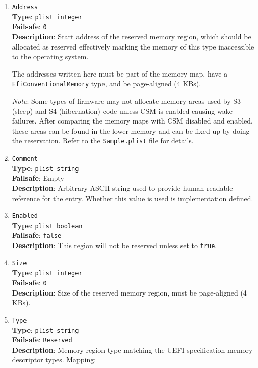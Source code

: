 \documentclass[]{article}
\begin{document}
\begin{enumerate}

\item
  \texttt{Address}\\
  \textbf{Type}: \texttt{plist\ integer}\\
  \textbf{Failsafe}: \texttt{0}\\
  \textbf{Description}: Start address of the reserved memory region, which should be allocated
  as reserved effectively marking the memory of this type inaccessible to the operating system.

  The addresses written here must be part of the memory map, have a \texttt{EfiConventionalMemory}
  type, and be page-aligned (4 KBs).

  \emph{Note}: Some types of firmware may not allocate memory areas used by S3 (sleep) and S4 (hibernation)
  code unless CSM is enabled causing wake failures. After comparing the memory maps with CSM disabled
  and enabled, these areas can be found in the lower memory and can be fixed up by doing the reservation.
  Refer to the \texttt{Sample.plist} file for details.

\item
  \texttt{Comment}\\
  \textbf{Type}: \texttt{plist\ string}\\
  \textbf{Failsafe}: Empty\\
  \textbf{Description}: Arbitrary ASCII string used to provide human readable
  reference for the entry. Whether this value is used is implementation defined.

\item
  \texttt{Enabled}\\
  \textbf{Type}: \texttt{plist\ boolean}\\
  \textbf{Failsafe}: \texttt{false}\\
  \textbf{Description}: This region will not be reserved unless set to \texttt{true}.

\item
  \texttt{Size}\\
  \textbf{Type}: \texttt{plist\ integer}\\
  \textbf{Failsafe}: \texttt{0}\\
  \textbf{Description}: Size of the reserved memory region, must be page-aligned (4 KBs).

\item
  \texttt{Type}\\
  \textbf{Type}: \texttt{plist\ string}\\
  \textbf{Failsafe}: \texttt{Reserved}\\
  \textbf{Description}: Memory region type matching the UEFI specification memory descriptor
  types. Mapping:


\end{enumerate}
\end{document}
